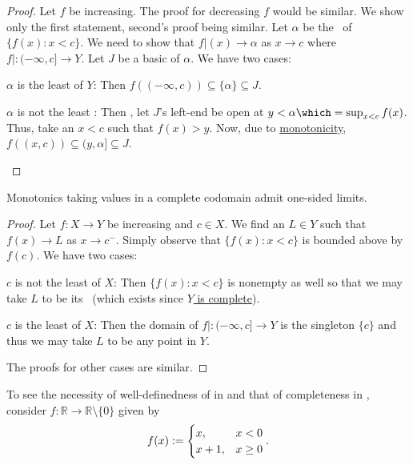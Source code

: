 	\begin{proof}
		Let $f$ be increasing. The proof for decreasing $f$ would be similar. We show only the first statement, second's proof being similar. Let $\alpha$ be the \lub\ of $\{f(x) : x < c\}$. We need to show that $f|(x)\to \alpha$ as $x\to c$ where $f|\colon (-\infty, c]\to Y$. Let $J$ be a basic \onbd of $\alpha$. We have two cases:
		\begin{mylist}
			\item $\alpha$ is the least \elt of $Y$: Then $f((-\infty, c)) \subseteq \{\alpha\}\subseteq J$.
			
			\item $\alpha$ is not the least \elt: Then \wlogg, let $J$'s left-end be open at $y < \alpha\which = \sup_{x <c} f(x)$. Thus, take an $x < c$ such that $f(x) > y$. Now, due to \uline{monotonicity}, $f((x, c))\subseteq (y, \alpha]\subseteq J$.\qedhere
		\end{mylist}
	\end{proof}
	
	\begin{cor}\label{COR: one-sided lims of monotonics in a complete codom}
		Monotonics taking values in a complete codomain admit one-sided limits.
	\end{cor}
	
	\begin{proof}
		Let $f\colon X\to Y$ be increasing and $c\in X$. We find an $L\in Y$ such that $f(x)\to L$ as $x\to c^-$. Simply observe that $\{f(x) : x < c\}$ is bounded above by $f(c)$. We have two cases:
		\begin{mylist}
			\item $c$ is not the least \elt of $X$: Then $\{f(x) : x < c\}$ is nonempty as well so that we may take $L$ to be its \lub\ (which exists since \uline{$Y$ is complete}).
			
			\item $c$ is the least \elt of $X$: Then the domain of $f|\colon(-\infty, c]\to Y$ is the singleton $\{c\}$ and thus we may take $L$ to be any point in $Y$.
		\end{mylist}
		The proofs for other cases are similar.
	\end{proof}
	
	\begin{rmk}
		To see the necessity of well-definedness of \RHS in  and that of completeness in , consider $f\colon \mathbb R\to\mathbb R\setminus\{0\}$ given by
		\[
		f(x) := 
		\begin{cases}
			x, & x < 0\\
			x + 1, & x \ge 0
		\end{cases}\text.
		\]
	\end{rmk}
	
